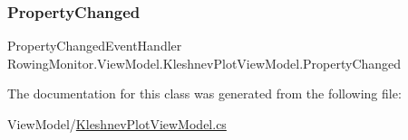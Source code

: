 \subsubsection{\texorpdfstring{Property\+Changed}{PropertyChanged}}
{\footnotesize\ttfamily Property\+Changed\+Event\+Handler Rowing\+Monitor.\+View\+Model.\+Kleshnev\+Plot\+View\+Model.\+Property\+Changed}



The documentation for this class was generated from the following file\+:\begin{DoxyCompactItemize}
\item 
View\+Model/\hyperlink{_kleshnev_plot_view_model_8cs}{Kleshnev\+Plot\+View\+Model.\+cs}\end{DoxyCompactItemize}
